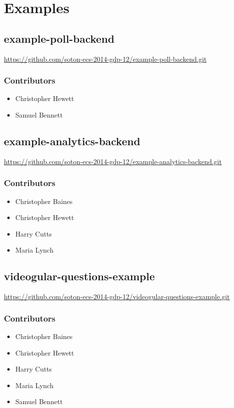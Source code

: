 \section{Examples}

\subsection{example-poll-backend}
\label{Section:Repo_example_poll_backend}

\url{https://github.com/soton-ecs-2014-gdp-12/example-poll-backend.git}

\subsubsection{Contributors}
\begin{itemize}
  \item Christopher Hewett
  \item Samuel Bennett
\end{itemize}

\subsection{example-analytics-backend}
\label{Section:Repo_example_analytics_backend}

\url{https://github.com/soton-ecs-2014-gdp-12/example-analytics-backend.git}

\subsubsection{Contributors}
\begin{itemize}
  \item Christopher Baines
  \item Christopher Hewett
  \item Harry Cutts
  \item Maria Lynch
\end{itemize}

\subsection{videogular-questions-example}
\label{Section:Repo_videogular-questions-example}

\url{https://github.com/soton-ecs-2014-gdp-12/videogular-questions-example.git}

\subsubsection{Contributors}
\begin{itemize}
  \item Christopher Baines
  \item Christopher Hewett
  \item Harry Cutts
  \item Maria Lynch
  \item Samuel Bennett
\end{itemize}

